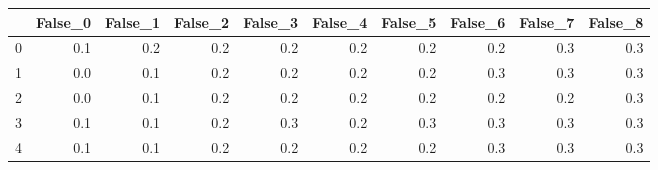 \begin{tabular}{lrrrrrrrrr}
\toprule
{} &  False\_0 &  False\_1 &  False\_2 &  False\_3 &  False\_4 &  False\_5 &  False\_6 &  False\_7 &  False\_8 \\ \hline
\midrule
0 &      0.1 &      0.2 &      0.2 &      0.2 &      0.2 &      0.2 &      0.2 &      0.3 &      0.3 \\ \hline
1 &      0.0 &      0.1 &      0.2 &      0.2 &      0.2 &      0.2 &      0.3 &      0.3 &      0.3 \\ \hline
2 &      0.0 &      0.1 &      0.2 &      0.2 &      0.2 &      0.2 &      0.2 &      0.2 &      0.3 \\ \hline
3 &      0.1 &      0.1 &      0.2 &      0.3 &      0.2 &      0.3 &      0.3 &      0.3 &      0.3 \\ \hline
4 &      0.1 &      0.1 &      0.2 &      0.2 &      0.2 &      0.2 &      0.3 &      0.3 &      0.3 \\ \hline
\bottomrule
\end{tabular}

